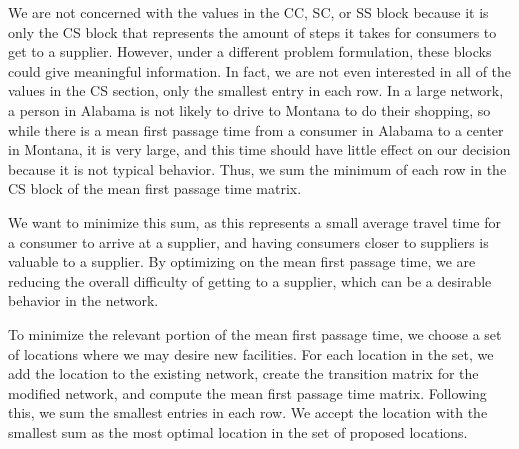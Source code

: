 \documentclass[twoside,twocolumn]{article}
\begin{document}
We are not concerned with the values in the CC, SC, or SS block because it is only the CS block that represents the amount of steps it takes for consumers to get to a supplier.
However, under a different problem formulation, these blocks could give meaningful information.
In fact, we are not even interested in all of the values in the CS section, only the smallest entry in each row.
In a large network, a person in Alabama is not likely to drive to Montana to do their shopping, so while there is a mean first passage time from a consumer in Alabama to a center in Montana, it is very large, and this time should have little effect on our decision because it is not typical behavior.
Thus, we sum the minimum of each row in the CS block of the mean first passage time matrix.

We want to minimize this sum, as this represents a small average travel time for a consumer to arrive at a supplier, and having consumers closer to suppliers is valuable to a supplier.
By optimizing on the mean first passage time, we are reducing the overall difficulty of getting to a supplier, which can be a desirable behavior in the network.

To minimize the relevant portion of the mean first passage time, we choose a set of locations where we may desire new facilities. 
For each location in the set, we add the location to the existing network, create the transition matrix for the modified network, and compute the mean first passage time matrix.
Following this, we sum the smallest entries in each row.
We accept the location with the smallest sum as the most optimal location in the set of proposed locations.

\end{document}
